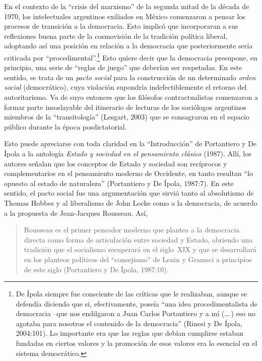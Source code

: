 En el contexto de la ``crisis del marxismo'' de la segunda mitad de la década de 1970, los intelectuales argentinos exiliados en México comenzaron a pensar los procesos de transición a la democracia. Esto implicó que incorporaran a sus reflexiones buena parte de la cosmovisión de la tradición política liberal, adoptando así una posición en relación a la democracia que posteriormente sería criticada por ``procedimental''.\footnote{De Ípola siempre fue consciente de las críticas que le realizaban, aunque se defendía diciendo que si, efectivamente, poseía ``una idea procedimentalista de democracia --que nos endilgaron a Juan Carlos Portantiero y a mí (\ldots.) eso no agotaba para nosotros el contenido de la democracia'' (Rinesi y De Ípola, 2004:101). Lo importante era que las reglas que debían cumplirse estaban fundadas en ciertos valores y la promoción de esos valores era lo esencial en el sistema democrático.} Esto quiere decir que la democracia presupone, en principio, una serie de ``reglas de juego'' que deberían ser respetadas. En este sentido, se trata de un \emph{pacto social} para la construcción de un determinado \emph{orden social} (democrático), cuya violación supondría indefectiblemente el retorno del autoritarismo. Va de suyo entonces que los filósofos contractualistas comenzaron a formar parte insoslayable del itinerario de lecturas de los sociólogos argentinos miembros de la ``transitología'' (Lesgart, 2003) que se consagraron en el espacio público durante la época posdictatorial.

Esto puede apreciarse con toda claridad en la ``Introducción'' de Portantiero y De Ípola a la antología \emph{Estado y sociedad en el pensamiento clásico} (1987). Allí, los autores señalan que los conceptos de Estado y sociedad son recíprocos y complementarios en el pensamiento moderno de Occidente, en tanto resultan ``lo opuesto al estado de naturaleza'' (Portantiero y De Ípola, 1987:7). En este sentido, el pacto social fue una argumentación que sirvió tanto al absolutismo de Thomas Hobbes y al liberalismo de John Locke como a la democracia, de acuerdo a la propuesta de Jean-Jacques Rousseau. Así,

\begin{quote}
Rousseau es el primer pensador moderno que plantea a la democracia directa como forma de articulación entre sociedad y Estado, abriendo una tradición que el socialismo recuperará en el siglo~XIX y que se desarrollará en los planteos políticos del ``consejismo'' de Lenin y Gramsci a principios de este siglo (Portantiero y De Ípola, 1987:10).
\end{quote}

